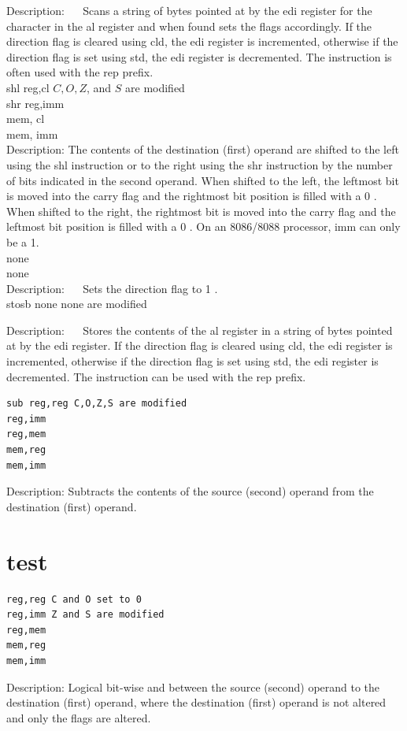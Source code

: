 \documentclass[10pt]{article}
\begin{document}
Description: $\quad$ Scans a string of bytes pointed at by the edi register for the character in the al register and when found sets the flags accordingly. If the direction flag is cleared using cld, the edi register is incremented, otherwise if the direction flag is set using std, the edi register is decremented. The instruction is often used with the rep prefix.\\
shl reg,cl $C, O, Z$, and $S$ are modified\\
shr reg,imm\\
mem, cl\\
mem, imm\\
Description: The contents of the destination (first) operand are shifted to the left using the shl instruction or to the right using the shr instruction by the number of bits indicated in the second operand. When shifted to the left, the leftmost bit is moved into the carry flag and the rightmost bit position is filled with a 0 . When shifted to the right, the rightmost bit is moved into the carry flag and the leftmost bit position is filled with a 0 . On an 8086/8088 processor, imm can only be a 1.\\
none\\
none\\
Description: $\quad$ Sets the direction flag to 1 .\\
stosb none none are modified

Description: $\quad$ Stores the contents of the al register in a string of bytes pointed at by the edi register. If the direction flag is cleared using cld, the edi register is incremented, otherwise if the direction flag is set using std, the edi register is decremented. The instruction can be used with the rep prefix.

\begin{verbatim}
sub reg,reg C,O,Z,S are modified
reg,imm
reg,mem
mem,reg
mem,imm
\end{verbatim}

Description: Subtracts the contents of the source (second) operand from the destination (first) operand.

\section*{test}
\begin{verbatim}
reg,reg C and O set to 0
reg,imm Z and S are modified
reg,mem
mem,reg
mem,imm
\end{verbatim}

Description: Logical bit-wise and between the source (second) operand to the destination (first) operand, where the destination (first) operand is not altered and only the flags are altered.
\end{document}
